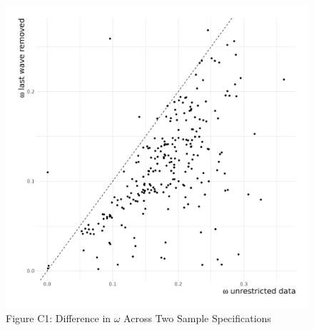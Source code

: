 \documentclass[
  12pt,
]{article}
\begin{document}
\begin{figure}[ht]
\begin{center}
\caption*{Figure C1: Difference in $\omega$ Across Two Sample Specifications} 

\begin{center}\includegraphics[width=5in]{../figures/figure_S3} \end{center}

\end{center}
\end{figure}
\end{document}
